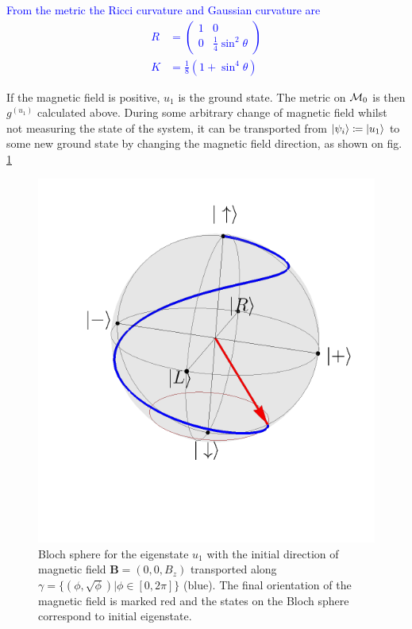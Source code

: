 \textcolor{blue}{
From the metric the Ricci curvature and Gaussian curvature are
\begin{align}
    R&=\begin{pmatrix}
        1&0\\
        0&\frac{1}{4}\sin^2\theta
    \end{pmatrix}\\
    K&=\frac{1}{8}(1+\sin^4\theta)
\end{align}
}

If the magnetic field is positive, $u_1$ is the ground state. The metric on $\mathcal{M}_0$ is then $g^{(u_1)}$ calculated above. During some arbitrary change of magnetic field whilst not measuring the state of the system, it can be transported from $\ket{\psi_i}\coloneqq \ket{u_1}$ to some new ground state by changing the magnetic field direction, as shown on fig. \ref{fig:blochArbitraryTransport}
\begin{figure}[h]
    \centering
    \includegraphics{../img/blochArbitraryTransport.pdf}
    \caption{Bloch sphere for the eigenstate $u_1$ with the initial direction of magnetic field $\mathbf B=(0,0,B_z)$ transported along $\gamma=\{(\phi,\sqrt{\phi})|\phi\in[0,2\pi]\}$ (blue). The final orientation of the magnetic field is marked red and the states on the Bloch sphere correspond to initial eigenstate.}
    \label{fig:blochArbitraryTransport}
\end{figure}

